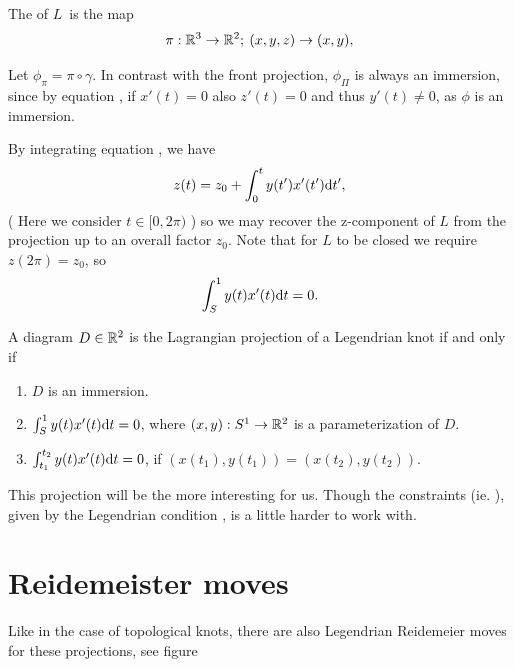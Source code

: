 \begin{defn}
The  of $L$ is the map
\[ \pi : \mathbb{R}^3 \to \mathbb{R}^2; \: (x,y,z) \to (x, y), \]
\end{defn}

Let $\phi_\pi = \pi \circ \gamma$. In contrast with the front projection,
$\phi_\Pi$ is always an immersion, since by equation , if
$x'(t) = 0$ also $z'(t) = 0$ and thus $y'(t) \ne 0$, as $\phi$ is an immersion.

By integrating equation , we have 
\[ z(t) = z_0 + \int_0^t y(t') x'(t') \mathrm{d} t',  \]
( Here we consider $t \in [0,2\pi)$ ) so we may recover the z-component of $L$ from the projection up to an overall
factor $z_0$. Note that for $L$ to be closed we require $z(2\pi) = z_0$, so 
\begin{equation}
\label{eq:lagrangian_pr_eq}
\int_S^1 y(t) x'(t) \mathrm{d} t = 0.
\end{equation}

\begin{lemma}
A diagram $D \in \mathbb{R}^2$ is the Lagrangian projection of a Legendrian knot if and
only if
\begin{enumerate}
\item $D$ is an immersion.
\item 
$\int_S^1 y(t) x'(t) \mathrm{d} t = 0$, where $(x,y): S^1 \to \mathbb{R}^2$ is a
parameterization of $D$.
\item 
$\int_{t_1}^{t_2} y(t) x'(t) \mathrm{d} t = 0$, if $(x(t_1),y(t_1)) = (x(t_2),y(t_2))$.
\end{enumerate}
\end{lemma}

This projection will be the more interesting for us. Though the constraints (ie.
), given by the Legendrian condition , is a little harder to work with. 

\section{Reidemeister moves}

Like in the case of topological knots, there are also Legendrian Reidemeier
moves for these projections, see figure 

